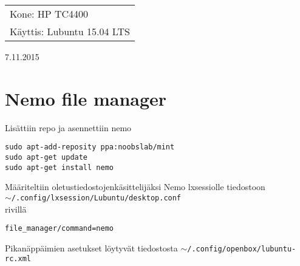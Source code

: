 \documentclass[main.tex]{subfiles}
\begin{document}
\thispagestyle{empty}
\begin{tabular}[t]{l}
Kone: HP TC4400\\
Käyttis: Lubuntu 15.04 LTS
\end{tabular}
\hfill 7.11.2015

{\section{Nemo file manager}}

Lisättiin repo ja asennettiin nemo

\begin{lstlisting}
sudo apt-add-reposity ppa:noobslab/mint
sudo apt-get update
sudo apt-get install nemo
\end{lstlisting}

Määriteltiin oletustiedostojenkäsittelijäksi Nemo lxsessiolle tiedostoon \\
\texttt{$\sim$/.config/lxsession/Lubuntu/desktop.conf} \\
rivillä 

\begin{lstlisting}
file_manager/command=nemo
\end{lstlisting}

Pikanäppäimien asetukset löytyvät tiedostosta \texttt{$\sim$/.config/openbox/lubuntu-rc.xml}
\end{document}
